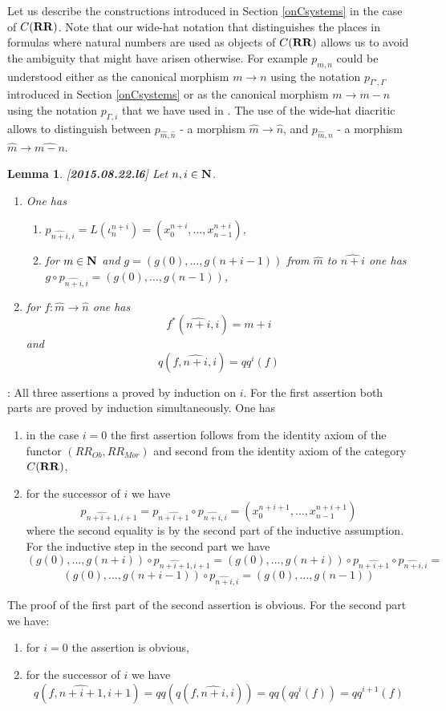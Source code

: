 \documentclass[11pt]{article}
\newenvironment{proof}{{\bf Proof}:}{\vskip 5mm }
\newtheorem{lemma}[proposition]{Lemma}
\newcommand{\llabel}[1]{\label{#1}[{\bf #1}]}
\newcommand{\sr}{\rightarrow}
\newcommand{\nn}{{\bf N\rm}}
\newcommand{\nat}{\nn}
\newcommand{\wh}{\widehat}
\newcommand{\RR}{{\bf RR}}
\begin{document}
%
Let us describe the constructions introduced in Section \ref{onCsystems} in the case of $C(\RR)$. Note that our wide-hat notation that distinguishes the places in formulas where natural numbers are used as objects of $C(\RR)$ allows us to avoid the ambiguity that might have arisen otherwise. For example $p_{m,n}$ could be understood either as the canonical morphism $m\sr n$ using the notation $p_{\Gamma',\Gamma}$ introduced in Section \ref{onCsystems} or as the canonical morphism $m\sr m-n$ using the notation $p_{\Gamma,i}$ that we have used in \cite{Csubsystems}.  The use of the wide-hat diacritic allows to distinguish between $p_{\wh{m},\wh{n}}$ - a morphism $\wh{m}\sr \wh{n}$,  and $p_{\wh{m},n}$ - a morphism $\wh{m}\sr \wh{m-n}$. 
%
\begin{lemma}
\llabel{2015.08.22.l6}
Let $n,i\in\nat$. 
%
\begin{enumerate}
\item One has
%
\begin{enumerate}
\item $p_{\wh{n+i},i}=L(\iota^{n+i}_{n})=(x_0^{n+i},\dots,x_{n-1}^{n+i})$,
\item for $m\in\nat$ and $g=(g(0),\dots,g(n+i-1))$ from $\wh{m}$ to $\wh{n+i}$ one has $g\circ p_{\wh{n+i},i}=(g(0),\dots,g(n-1))$,
\end{enumerate}
%
\item for $f:\wh{m}\sr \wh{n}$ one has
%
$$f^*(\wh{n+i},i)=m+i$$
%
and
%
$$q(f,\wh{n+i},i)=qq^i(f)$$
%
\end{enumerate}
\end{lemma}
%
\begin{proof}
All three assertions a proved by induction on $i$. For the first assertion both parts are proved by induction simultaneously. One has
%
\begin{enumerate}
\item in the case $i=0$ the first assertion follows from the identity axiom of the functor $(RR_{Ob},RR_{Mor})$ and second from the identity axiom of the category $C(\RR)$,
\item for the successor of $i$ we have
%
$$p_{\wh{n+i+1},i+1}=p_{\wh{n+i+1}}\circ p_{\wh{n+i},i}=(x_0^{n+i+1},\dots,x_{n-1}^{n+i+1})$$
%
where the second equality is by the second part of the inductive assumption. For the inductive step in the second part we have
%
$$(g(0),\dots,g(n+i))\circ p_{\wh{n+i+1},i+1}=(g(0),\dots,g(n+i))\circ p_{\wh{n+i+1}}\circ p_{\wh{n+i},i}=$$$$
(g(0),\dots,g(n+i-1))\circ p_{\wh{n+i},i}=(g(0),\dots,g(n-1))$$
%
\end{enumerate}
%
The proof of the first part of the second assertion is obvious. For the second part we have:
%
\begin{enumerate}
\item for $i=0$ the assertion is obvious,
\item for the successor of $i$ we have 
%
$$q(f,\wh{n+i+1},i+1)=qq(q(f,\wh{n+i},i))=qq(qq^i(f))=qq^{i+1}(f)$$
%
\end{enumerate}
%
\end{proof}
\end{document}
